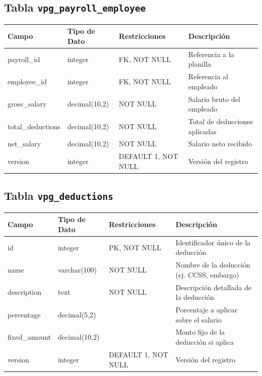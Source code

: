 \begin{center}
	\subsection{Tabla \texttt{vpg\_payroll\_employee}}
	\small
	\begin{tabular}{|l|l|l|p{6cm}|}
		\hline
		\textbf{Campo}    & \textbf{Tipo de Dato} & \textbf{Restricciones} & \textbf{Descripción}           \\
		\hline
		payroll\_id       & integer               & FK, NOT NULL           & Referencia a la planilla       \\
		employee\_id      & integer               & FK, NOT NULL           & Referencia al empleado         \\
		gross\_salary     & decimal(10,2)         & NOT NULL               & Salario bruto del empleado     \\
		total\_deductions & decimal(10,2)         & NOT NULL               & Total de deducciones aplicadas \\
		net\_salary       & decimal(10,2)         & NOT NULL               & Salario neto recibido          \\
		version           & integer               & DEFAULT 1, NOT NULL    & Versión del registro           \\
		\hline
	\end{tabular}
	\normalsize

	\subsection{Tabla \texttt{vpg\_deductions}}
	\small
	\begin{tabular}{|l|l|l|p{6cm}|}
		\hline
		\textbf{Campo} & \textbf{Tipo de Dato} & \textbf{Restricciones} & \textbf{Descripción}                       \\
		\hline
		id             & integer               & PK, NOT NULL           & Identificador único de la deducción        \\
		name           & varchar(100)          & NOT NULL               & Nombre de la deducción (ej. CCSS, embargo) \\
		description    & text                  & NOT NULL               & Descripción detallada de la deducción      \\
		percentage     & decimal(5,2)          &                        & Porcentaje a aplicar sobre el salario      \\
		fixed\_amount  & decimal(10,2)         &                        & Monto fijo de la deducción si aplica       \\
		version        & integer               & DEFAULT 1, NOT NULL    & Versión del registro                       \\
		\hline
	\end{tabular}
	\normalsize


\end{center}
